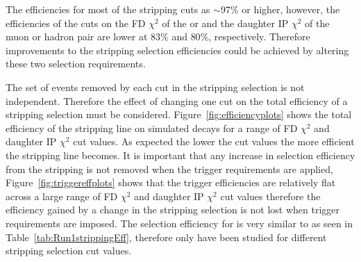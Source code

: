The efficiencies for most of the stripping cuts as $\sim 97 \%$ or higher, however, the efficiencies of the cuts on the FD $\chi^{2}$ of the \bsd or \jpsi and the daughter IP $\chi^{2}$ of the muon or hadron pair are lower at $83 \%$ and $80 \%$, respectively. Therefore improvements to the stripping selection efficiencies could be achieved by altering these two selection requirements. 



The set of events removed by each cut in the stripping selection is not independent. Therefore the effect of changing one cut on the total efficiency of a stripping selection must be considered. Figure~\ref{fig:efficiencyplots} shows the total efficiency of the \bsmumu stripping line on simulated \bsmumu decays for a range of FD $\chi^{2}$ and daughter IP $\chi^{2}$ cut values. As expected the lower the cut values the more efficient the stripping line becomes. It is important that any increase in \bsmumu selection efficiency from the stripping is not removed when the trigger requirements are applied, Figure~\ref{fig:triggereffplots} shows that the trigger efficiencies are relatively flat across a large range of FD $\chi^{2}$ and daughter IP $\chi^{2}$ cut values therefore the efficiency gained by a change in the stripping selection is not lost when trigger requirements are imposed. The selection efficiency for \bdmumu is very similar to \bsmumu as seen in Table~\ref{tab:Run1strippingEff}, therefore only \bsmumu have been studied for different stripping selection cut values. 


